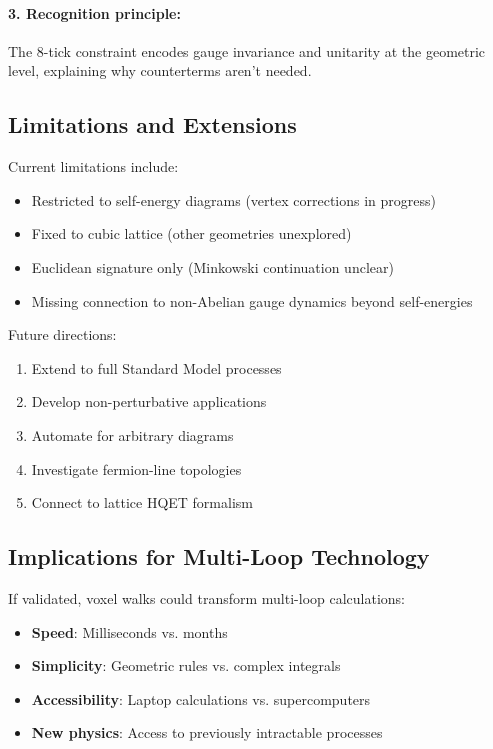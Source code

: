 \documentclass[11pt,a4paper]{article}
\theoremstyle{definition}
\theoremstyle{remark}
\begin{document}
\paragraph{3. Recognition principle:} The 8-tick constraint encodes gauge invariance and unitarity at the geometric level, explaining why counterterms aren't needed.

\subsection{Limitations and Extensions}

Current limitations include:
\begin{itemize}
\item Restricted to self-energy diagrams (vertex corrections in progress)
\item Fixed to cubic lattice (other geometries unexplored)
\item Euclidean signature only (Minkowski continuation unclear)
\item Missing connection to non-Abelian gauge dynamics beyond self-energies
\end{itemize}

Future directions:
\begin{enumerate}
\item Extend to full Standard Model processes
\item Develop non-perturbative applications
\item Automate for arbitrary diagrams
\item Investigate fermion-line topologies
\item Connect to lattice HQET formalism
\end{enumerate}

\subsection{Implications for Multi-Loop Technology}

If validated, voxel walks could transform multi-loop calculations:
\begin{itemize}
\item \textbf{Speed}: Milliseconds vs. months
\item \textbf{Simplicity}: Geometric rules vs. complex integrals
\item \textbf{Accessibility}: Laptop calculations vs. supercomputers
\item \textbf{New physics}: Access to previously intractable processes
\end{itemize}
\end{document}
